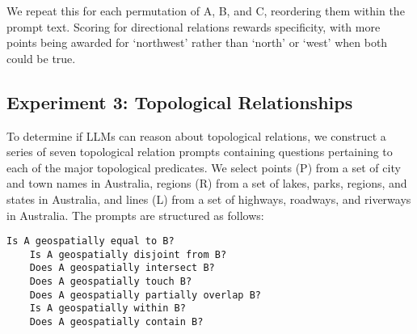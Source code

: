 \noindent We repeat this for each permutation of A, B, and C, reordering them within the prompt text.
Scoring for directional relations rewards specificity, with more points being awarded for `northwest' rather than `north' or `west' when both could be true. 



\subsection{Experiment 3: Topological Relationships}
To determine if LLMs can reason about topological relations, we construct a series of seven topological relation prompts containing questions pertaining to each of the major topological predicates.
We select points (P) from a set of city and town names in Australia, regions (R) from a set of lakes, parks, regions, and states in Australia, and lines (L) from a set of highways, roadways, and riverways in Australia.
The prompts are structured as follows:

\begin{lstlisting}[title=Prompts 5-11: Topological Relation Prompts]
    Is A geospatially equal to B?
    Is A geospatially disjoint from B?
    Does A geospatially intersect B?
    Does A geospatially touch B?
    Does A geospatially partially overlap B?
    Is A geospatially within B?
    Does A geospatially contain B?
\end{lstlisting}

